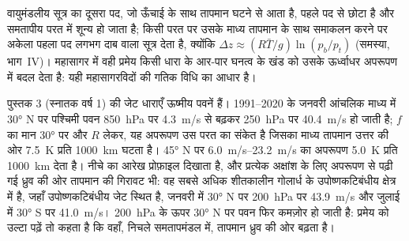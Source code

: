 वायुमंडलीय सूत्र का दूसरा पद, जो ऊँचाई के साथ तापमान घटने से आता है,
पहले पद से छोटा है और समतापीय परत में शून्य हो जाता है;
किसी परत पर उसके माध्य तापमान के साथ समाकलन करने पर
अकेला पहला पद लगभग दाब वाला सूत्र देता है, क्योंकि $\Delta z \approx (R\bar T/g)
\ln(p_b/p_t)$ (समस्या, भाग~IV)। महासागर में वही प्रमेय किसी धारा के आर-पार घनत्व के
खंड को उसके ऊर्ध्वाधर अपरूपण में बदल देता है:
यही महासागरविदों की गतिक विधि का आधार है।


पुस्तक 3 (स्नातक वर्ष 1) की जेट धाराएँ ऊष्मीय पवनें हैं।
1991--2020 के जनवरी आंचलिक माध्य में \ang{30} N पर पश्चिमी पवन
\qty{850}{hPa} पर \qty{4.3}{m/s} से बढ़कर \qty{250}{hPa} पर \qty{40.4}{m/s} हो जाती है;
$f$ का मान \ang{30} पर और $R$ लेकर, यह अपरूपण उस परत का संकेत है जिसका माध्य
तापमान उत्तर की ओर \qty{7.5}{K} प्रति \qty{1000}{km} घटता है। \ang{45}
N पर \qtyrange{6.0}{23.2}{m/s} का अपरूपण
\qty{5.0}{K} प्रति \qty{1000}{km} देता है। नीचे का आरेख प्रोफ़ाइल दिखाता है, और प्रत्येक अक्षांश के लिए
अपरूपण से पढ़ी गई ध्रुव की ओर तापमान की गिरावट भी: वह सबसे अधिक
शीतकालीन गोलार्ध के उपोष्णकटिबंधीय क्षेत्र में है, जहाँ उपोष्णकटिबंधीय जेट स्थित है,
जनवरी में \ang{30} N पर \qty{200}{hPa} पर \qty{43.9}{m/s} और
जुलाई में \ang{30} S पर \qty{41.0}{m/s}। \qty{200}{hPa} के ऊपर \ang{30} N पर
पवन फिर कमज़ोर हो जाती है:  प्रमेय को उल्टा पढ़ें तो कहता है कि
वहाँ, निचले समतापमंडल में, तापमान ध्रुव की ओर बढ़ता है।

